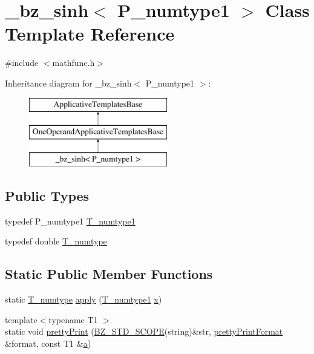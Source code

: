 \hypertarget{class__bz__sinh}{}\section{\+\_\+bz\+\_\+sinh$<$ P\+\_\+numtype1 $>$ Class Template Reference}
\label{class__bz__sinh}


{\ttfamily \#include $<$mathfunc.\+h$>$}

Inheritance diagram for \+\_\+bz\+\_\+sinh$<$ P\+\_\+numtype1 $>$\+:\begin{figure}[H]
\begin{center}
\leavevmode
\includegraphics[height=3.000000cm]{class__bz__sinh}
\end{center}
\end{figure}
\subsection*{Public Types}
\begin{DoxyCompactItemize}
\item 
typedef P\+\_\+numtype1 \hyperlink{class__bz__sinh_a63f88eb4337948bc55eee56c51fd927f}{T\+\_\+numtype1}
\item 
typedef double \hyperlink{class__bz__sinh_a6d879f26bb8d1bf5cff2c059abca3990}{T\+\_\+numtype}
\end{DoxyCompactItemize}
\subsection*{Static Public Member Functions}
\begin{DoxyCompactItemize}
\item 
static \hyperlink{class__bz__sinh_a6d879f26bb8d1bf5cff2c059abca3990}{T\+\_\+numtype} \hyperlink{class__bz__sinh_a6cfb953560f0bd2d178a8d44ef2ea00e}{apply} (\hyperlink{class__bz__sinh_a63f88eb4337948bc55eee56c51fd927f}{T\+\_\+numtype1} \hyperlink{vecnorm1_8cc_ac73eed9e41ec09d58f112f06c2d6cb63}{x})
\item 
{\footnotesize template$<$typename T1 $>$ }\\static void \hyperlink{class__bz__sinh_a9060a5b3ace356a63ef9243b307b1be6}{pretty\+Print} (\hyperlink{numinquire_8h_a2b24ffc3b4ef9803956bc7715c6c7b83}{B\+Z\+\_\+\+S\+T\+D\+\_\+\+S\+C\+O\+P\+E}(string)\&str, \hyperlink{classprettyPrintFormat}{pretty\+Print\+Format} \&format, const T1 \&\hyperlink{gen__mat5files_8m_aae328bf20413f220e38aec4d95bfd6da}{a})
\end{DoxyCompactItemize}


